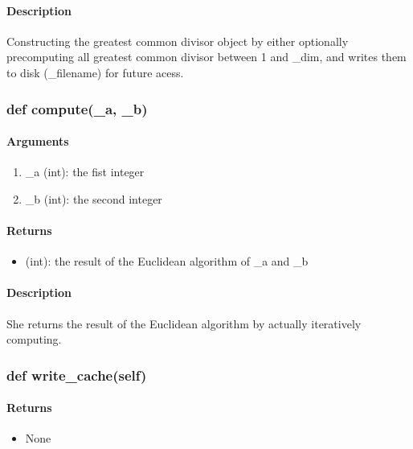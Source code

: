 \documentclass[refman]{scrartcl}
\begin{document}
\paragraph*{Description}

Constructing the greatest common divisor object by either optionally precomputing all greatest common divisor between 1 and \_dim, and writes them to disk (\_filename) for future acess.

\subsubsection{def compute(\_a, \_b)}

\paragraph*{Arguments}

\begin{enumerate}
	\item \_a (int): the fist integer
	\item \_b (int): the second integer
\end{enumerate}

\paragraph*{Returns}

\begin{itemize}
	\item (int): the result of the Euclidean algorithm of \_a and \_b
\end{itemize}

\paragraph*{Description}

She returns the result of the Euclidean algorithm by actually iteratively computing.

\subsubsection{def write\_cache(self)}

\paragraph*{Returns}

\begin{itemize}
	\item None
\end{itemize}
\end{document}
